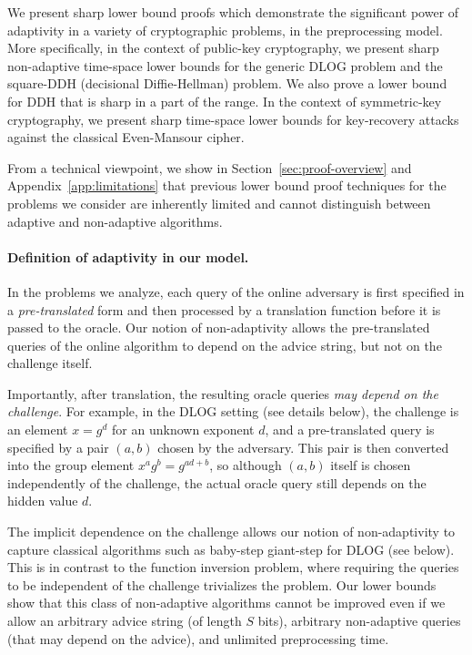 \documentclass[11pt]{article}
\begin{document}
We present sharp lower bound proofs which demonstrate the significant power of adaptivity in a variety of cryptographic problems, in the preprocessing model.
More specifically, in the context of public-key cryptography, we present sharp non-adaptive time-space lower bounds for the generic DLOG problem and the square-DDH (decisional Diffie-Hellman) problem. We also prove a  
lower bound for DDH that is sharp in a part of the range. In the context of symmetric-key cryptography, we present sharp time-space lower bounds for key-recovery attacks against the classical Even-Mansour cipher. 

From a technical viewpoint, we show in Section~\ref{sec:proof-overview} and Appendix~\ref{app:limitations} that previous lower bound proof techniques for the problems we consider are inherently limited and cannot distinguish between adaptive and non-adaptive algorithms.  

\paragraph{Definition of adaptivity in our model.}
In the problems we analyze, each query of the online adversary is first specified in a \emph{pre-translated} form and then processed by a translation function before it is passed to the oracle.
Our notion of non-adaptivity allows the pre-translated queries of the online algorithm to depend on the advice string, but not on the challenge itself.

Importantly, after translation, the resulting oracle queries \emph{may depend on the challenge}. For example, in the DLOG setting (see details below), the challenge is an element $x=g^d$ for an unknown exponent $d$, and a pre-translated query is specified by a pair $(a,b)$ chosen by the adversary. This pair is then converted into the group element $x^a g^b = g^{ad+b}$, so although $(a,b)$ itself is chosen independently of the challenge, the actual oracle query still depends on the hidden value $d$.

The implicit dependence on the challenge allows our notion of non-adaptivity to capture classical algorithms such as baby-step giant-step for DLOG (see below). This is in contrast to the function inversion problem, where requiring the queries to be independent of the challenge trivializes the problem. Our lower bounds show that this class of non-adaptive algorithms cannot be improved even if we allow an arbitrary advice string (of length $S$ bits), arbitrary non-adaptive queries (that may depend on the advice), and unlimited preprocessing time.
\end{document}
